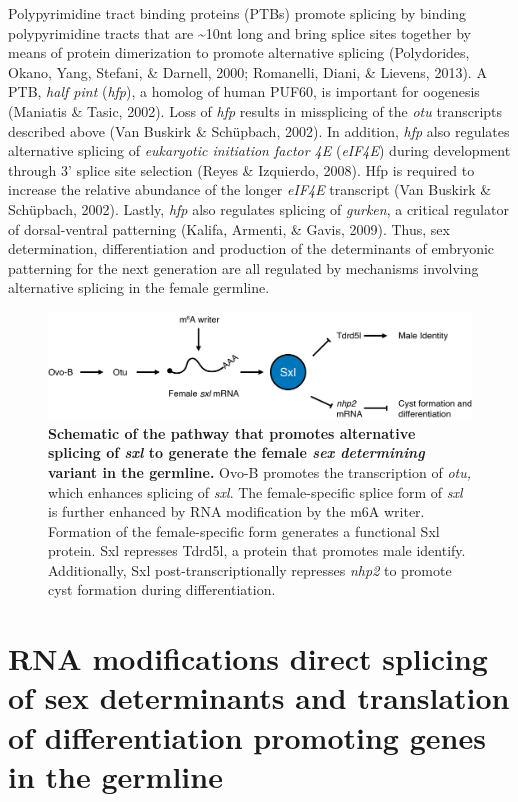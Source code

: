 \documentclass[12pt,oneside]{reedthesis}
\begin{document}
Polypyrimidine tract binding proteins (PTBs) promote splicing by binding
polypyrimidine tracts that are \textasciitilde10nt long and bring splice sites
together by means of protein dimerization to promote alternative
splicing (Polydorides, Okano, Yang, Stefani, \& Darnell, 2000; Romanelli, Diani, \& Lievens, 2013). A PTB, \emph{half pint}
(\emph{hfp}), a homolog of human PUF60, is important for oogenesis
(Maniatis \& Tasic, 2002). Loss of \emph{hfp} results in missplicing of the \emph{otu}
transcripts described above (Van Buskirk \& Schüpbach, 2002). In addition, \emph{hfp}
also regulates alternative splicing of \emph{eukaryotic initiation factor 4E}
(\emph{eIF4E}) during development through 3' splice site selection
(Reyes \& Izquierdo, 2008). Hfp is required to increase the relative abundance of
the longer \emph{eIF4E} transcript (Van Buskirk \& Schüpbach, 2002). Lastly, \emph{hfp} also
regulates splicing of \emph{gurken}, a critical regulator of dorsal-ventral
patterning (Kalifa, Armenti, \& Gavis, 2009). Thus, sex determination, differentiation
and production of the determinants of embryonic patterning for the next
generation are all regulated by mechanisms involving alternative
splicing in the female germline.
\begin{figure}

{\centering \includegraphics[width=0.97\linewidth]{./figure/Book Chapter/Figure2} 

}

\caption[\textbf{Schematic of the pathway that promotes alternative splicing of \emph{sxl}.}]{\textbf{Schematic of the pathway that promotes alternative splicing of \emph{sxl} to generate the female \emph{sex determining} variant in the germline.} Ovo-B promotes the transcription of \emph{otu,} which enhances splicing of \emph{sxl}. The female-specific splice form of \emph{sxl} is further enhanced by RNA modification by the m6A writer. Formation of the female-specific form generates a functional Sxl protein. Sxl represses Tdrd5l, a protein that promotes male identify. Additionally, Sxl post-transcriptionally represses \emph{nhp2} to promote cyst formation during differentiation.}\label{fig:unnamed-chunk-5}
\end{figure}
\hypertarget{rna-modifications-direct-splicing-of-sex-determinants-and-translation-of-differentiation-promoting-genes-in-the-germline}{%
\section{RNA modifications direct splicing of sex determinants and translation of differentiation promoting genes in the germline}\label{rna-modifications-direct-splicing-of-sex-determinants-and-translation-of-differentiation-promoting-genes-in-the-germline}}
\end{document}
